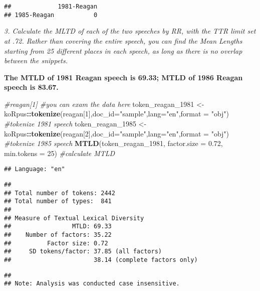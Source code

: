 \documentclass[]{article}
\newenvironment{Shaded}{\begin{snugshade}}{\end{snugshade}}
\newcommand{\KeywordTok}[1]{\textcolor[rgb]{0.13,0.29,0.53}{\textbf{#1}}}
\newcommand{\DataTypeTok}[1]{\textcolor[rgb]{0.13,0.29,0.53}{#1}}
\newcommand{\DecValTok}[1]{\textcolor[rgb]{0.00,0.00,0.81}{#1}}
\newcommand{\FloatTok}[1]{\textcolor[rgb]{0.00,0.00,0.81}{#1}}
\newcommand{\StringTok}[1]{\textcolor[rgb]{0.31,0.60,0.02}{#1}}
\newcommand{\CommentTok}[1]{\textcolor[rgb]{0.56,0.35,0.01}{\textit{#1}}}
\newcommand{\OperatorTok}[1]{\textcolor[rgb]{0.81,0.36,0.00}{\textbf{#1}}}
\newcommand{\NormalTok}[1]{#1}
\begin{document}
\begin{verbatim}
##             1981-Reagan
## 1985-Reagan           0
\end{verbatim}

\emph{3. Calculate the MLTD of each of the two speeches by RR, with the
TTR limit set at .72. Rather than covering the entire speech, you can
find the Mean Lengths starting from 25 different places in each speech,
as long as there is no overlap between the snippets.}

\textbf{The MTLD of 1981 Reagan speech is 69.33; MTLD of 1986 Reagan
speech is 83.67. }

\begin{Shaded}
\begin{Highlighting}[]
\CommentTok{#reagan[1] #you can exam the data here}
\NormalTok{token_reagan_}\DecValTok{1981}\NormalTok{ <-}\StringTok{ }\NormalTok{koRpus}\OperatorTok{::}\KeywordTok{tokenize}\NormalTok{(reagan[}\DecValTok{1}\NormalTok{],}\DataTypeTok{doc_id=}\StringTok{"sample"}\NormalTok{,}\DataTypeTok{lang=}\StringTok{"en"}\NormalTok{,}\DataTypeTok{format =} \StringTok{"obj"}\NormalTok{) }\CommentTok{#tokenize 1981 speech}
\NormalTok{token_reagan_}\DecValTok{1985}\NormalTok{ <-}\StringTok{ }\NormalTok{koRpus}\OperatorTok{::}\KeywordTok{tokenize}\NormalTok{(reagan[}\DecValTok{2}\NormalTok{],}\DataTypeTok{doc_id=}\StringTok{"sample"}\NormalTok{,}\DataTypeTok{lang=}\StringTok{"en"}\NormalTok{,}\DataTypeTok{format =} \StringTok{"obj"}\NormalTok{) }\CommentTok{#tokenize 1985 speech}
\KeywordTok{MTLD}\NormalTok{(token_reagan_}\DecValTok{1981}\NormalTok{, }\DataTypeTok{factor.size =} \FloatTok{0.72}\NormalTok{, }\DataTypeTok{min.tokens =} \DecValTok{25}\NormalTok{) }\CommentTok{#calculate MTLD}
\end{Highlighting}
\end{Shaded}

\begin{verbatim}
## Language: "en"
\end{verbatim}

\begin{verbatim}
## 
## Total number of tokens: 2442
## Total number of types:  841
## 
## Measure of Textual Lexical Diversity
##                 MTLD: 69.33
##    Number of factors: 35.22
##          Factor size: 0.72
##     SD tokens/factor: 37.85 (all factors)
##                       38.14 (complete factors only)
\end{verbatim}

\begin{verbatim}
## 
## Note: Analysis was conducted case insensitive.
\end{verbatim}
\end{document}
